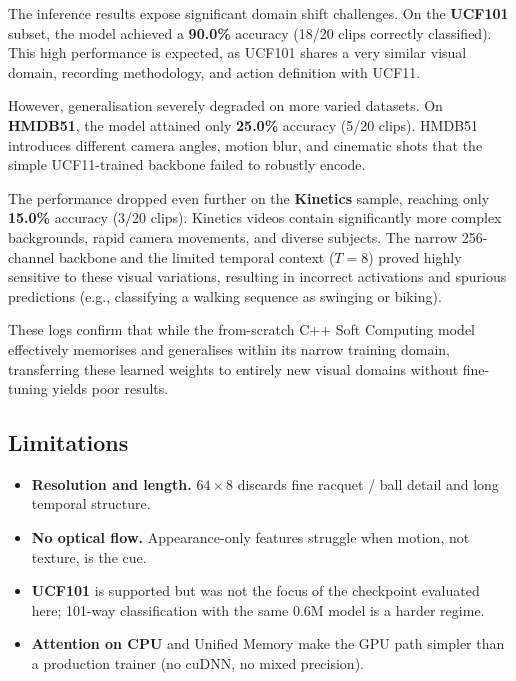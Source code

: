 \documentclass[11pt,a4paper]{article}
\begin{document}
The inference results expose significant domain shift challenges. On the \textbf{UCF101} subset, the model achieved a \textbf{90.0\%} accuracy (18/20 clips correctly classified). This high performance is expected, as UCF101 shares a very similar visual domain, recording methodology, and action definition with UCF11.

However, generalisation severely degraded on more varied datasets. On \textbf{HMDB51}, the model attained only \textbf{25.0\%} accuracy (5/20 clips). HMDB51 introduces different camera angles, motion blur, and cinematic shots that the simple UCF11-trained backbone failed to robustly encode.

The performance dropped even further on the \textbf{Kinetics} sample, reaching only \textbf{15.0\%} accuracy (3/20 clips). Kinetics videos contain significantly more complex backgrounds, rapid camera movements, and diverse subjects. The narrow 256-channel backbone and the limited temporal context ($T=8$) proved highly sensitive to these visual variations, resulting in incorrect activations and spurious predictions (e.g., classifying a walking sequence as swinging or biking).

These logs confirm that while the from-scratch C++ Soft Computing model effectively memorises and generalises within its narrow training domain, transferring these learned weights to entirely new visual domains without fine-tuning yields poor results.

\subsection{Limitations}

\begin{itemize}
  \item \textbf{Resolution and length.} $64\times 8$ discards fine
        racquet / ball detail and long temporal structure.
  \item \textbf{No optical flow.} Appearance-only features struggle
        when motion, not texture, is the cue.
  \item \textbf{UCF101} is supported but was not the focus of the
        checkpoint evaluated here; 101-way classification with the same
        0.6M model is a harder regime.
  \item \textbf{Attention on CPU} and Unified Memory make the GPU path
        simpler than a production trainer (no cuDNN, no mixed precision).
\end{itemize}
\end{document}
